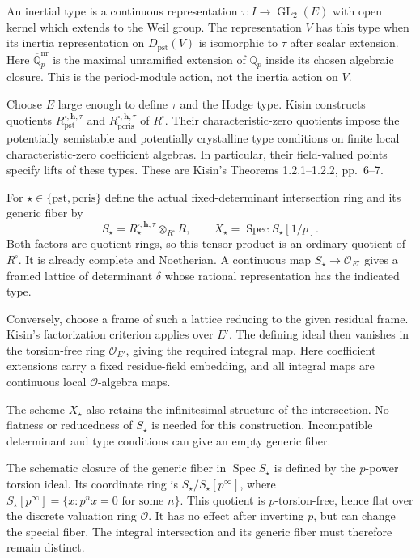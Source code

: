 An inertial type is a continuous representation
$\tau:I\to\operatorname{GL}_2(E)$ with open kernel which extends to
the Weil group. The representation $V$ has this
type when its inertia representation on $D_{\mathrm{pst}}(V)$
is isomorphic to $\tau$ after scalar extension. Here
$\overline{\mathbb Q}_p^{\mathrm{nr}}$ is the maximal unramified
extension of $\mathbb Q_p$ inside its chosen algebraic closure.
This is the period-module action, not the inertia action on $V$.

Choose $E$ large enough to define $\tau$ and the Hodge type.
Kisin constructs quotients $R^{\square,\mathbf h,\tau}_{\mathrm{pst}}$
and $R^{\square,\mathbf h,\tau}_{\mathrm{pcris}}$ of $R^\square$.
Their characteristic-zero quotients impose the potentially semistable
and potentially crystalline type conditions on finite local
characteristic-zero coefficient algebras. In particular, their field-valued points specify lifts of these types.
These are Kisin's Theorems 1.2.1--1.2.2, pp.~6--7.

For $\star\in\{\mathrm{pst},\mathrm{pcris}\}$ define the actual
fixed-determinant intersection ring and its generic fiber by
\[
 S_\star=R^{\square,\mathbf h,\tau}_\star
             \otimes_{R^\square}R,
 \qquad X_\star=\operatorname{Spec}S_\star[1/p].
\]
Both factors are quotient rings, so this tensor product is an
ordinary quotient of $R^\square$. It is already complete and
Noetherian. A continuous map $S_\star\to\mathcal O_{E'}$
gives a framed lattice of determinant $\delta$ whose rational
representation has the indicated type.

Conversely, choose a frame of such a lattice reducing to the
given residual frame. Kisin's factorization criterion applies over
$E'$. The defining ideal then vanishes in the torsion-free ring
$\mathcal O_{E'}$, giving the required integral map. Here coefficient extensions
carry a fixed residue-field embedding, and all integral maps are
continuous local $\mathcal O$-algebra maps.

The scheme $X_\star$ also retains the infinitesimal structure of
the intersection. No flatness or reducedness of $S_\star$ is needed
for this construction. Incompatible determinant and type conditions
can give an empty generic fiber.

The schematic closure of the generic fiber in $\operatorname{Spec}S_\star$
is defined by the $p$-power torsion ideal. Its coordinate ring is
$S_\star/S_\star[p^\infty]$, where
$S_\star[p^\infty]=\{x:p^n x=0\text{ for some }n\}$.
This quotient is $p$-torsion-free, hence flat over the discrete
valuation ring $\mathcal O$. It has no effect after inverting $p$,
but can change the special fiber. The integral intersection and its generic fiber
must therefore remain distinct.

